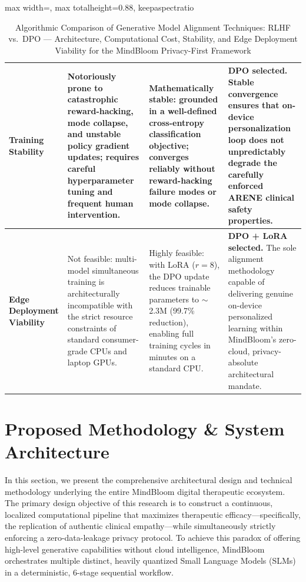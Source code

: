 \documentclass[12pt,twoside]{article}
\begin{document}
\begin{table}[p]
\begin{adjustbox}{max width=\textwidth, max totalheight=0.88\textheight, keepaspectratio}
\begin{tabular}{|p{5.0cm}|p{7.2cm}|p{7.2cm}|p{7.2cm}|}
\hline
\textbf{Training Stability} & Notoriously prone to catastrophic reward-hacking, mode collapse, and unstable policy gradient updates; requires careful hyperparameter tuning and frequent human intervention. & Mathematically stable: grounded in a well-defined cross-entropy classification objective; converges reliably without reward-hacking failure modes or mode collapse. & \textbf{DPO selected.} Stable convergence ensures that on-device personalization loop does not unpredictably degrade the carefully enforced ARENE clinical safety properties. \\
\hline
\textbf{Edge Deployment Viability} & Not feasible: multi-model simultaneous training is architecturally incompatible with the strict resource constraints of standard consumer-grade CPUs and laptop GPUs. & Highly feasible: with LoRA ($r=8$), the DPO update reduces trainable parameters to $\sim$2.3M (99.7\% reduction), enabling full training cycles in minutes on a standard CPU. & \textbf{DPO + LoRA selected.} The sole alignment methodology capable of delivering genuine on-device personalized learning within MindBloom's zero-cloud, privacy-absolute architectural mandate. \\
\hline
\end{tabular}
\end{adjustbox}
\caption{Algorithmic Comparison of Generative Model Alignment Techniques: RLHF vs.\ DPO --- Architecture, Computational Cost, Stability, and Edge Deployment Viability for the MindBloom Privacy-First Framework}
\label{tab:alignment}
\end{table}

\section{Proposed Methodology \& System Architecture}

In this section, we present the comprehensive architectural design and technical methodology underlying the entire MindBloom digital therapeutic ecosystem. The primary design objective of this research is to construct a continuous, localized computational pipeline that maximizes therapeutic efficacy---specifically, the replication of authentic clinical empathy---while simultaneously strictly enforcing a zero-data-leakage privacy protocol. To achieve this paradox of offering high-level generative capabilities without cloud intelligence, MindBloom orchestrates multiple distinct, heavily quantized Small Language Models (SLMs) in a deterministic, 6-stage sequential workflow.
\end{document}

